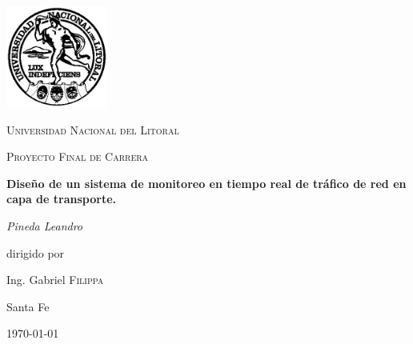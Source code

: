 \documentclass[a4paper,10pt, oneside]{book}
\begin{document}
\begin{titlepage}
	\centering
	\includegraphics[width=0.25\textwidth]{Universidad_del_Litoral}\par\vspace{1cm}
	{\scshape\LARGE Universidad Nacional del Litoral \par}
	\vspace{1cm}
	{\scshape\Large Proyecto Final de Carrera\par}
	\vspace{1.5cm}
	{\huge\bfseries Diseño de un sistema de monitoreo en tiempo real de tráfico de red en capa de transporte.\par}
	\vspace{2cm}
	{\Large\itshape Pineda Leandro\par}
	\vfill
	dirigido por\par
	Ing. Gabriel \textsc{Filippa}

	\vfill
	
	
	
	\large Santa Fe\par
	{\large \today\par}
	
\end{titlepage}

\modulolinenumbers[5]





\newpage
 
\nocite{*}
\printbibliography
\end{document}
